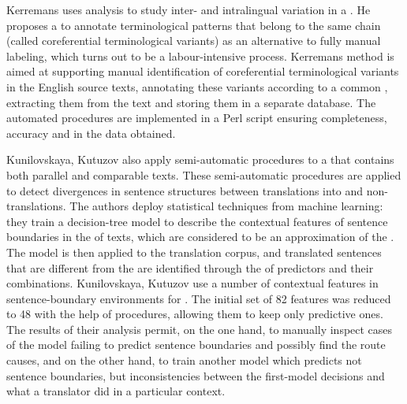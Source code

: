 \documentclass[output=paper]{langsci/langscibook.cls}
\begin{document}
	Kerremans uses  analysis to study inter- and intralingual  variation in a . He proposes a  to annotate terminological patterns that belong to the same  chain (called coreferential terminological variants) as an alternative to fully manual labeling, which turns out to be a labour-intensive process. Kerremans method is aimed at supporting manual identification of coreferential terminological variants in the English source texts, annotating these variants according to a common , extracting them from the text and storing them in a separate database. The automated procedures are implemented in a Perl script ensuring completeness, accuracy and  in the data obtained.
	
	Kunilovskaya, Kutuzov also apply semi-automatic procedures to a  that contains both parallel and comparable texts. These semi-automatic procedures are applied to detect divergences in sentence structures between translations into  and  non-translations.  
	The authors deploy statistical techniques from machine learning: they train a decision-tree model to describe the contextual features of sentence boundaries in the  of  texts, which are considered to be an approximation of the  . The model is then applied to the translation  corpus, and translated sentences that are different from the   are identified through the  of predictors and their combinations. Kunilovskaya, Kutuzov use a number of contextual features in sentence-boundary environments for . The initial set of 82 features was reduced to 48 with the help of  procedures, allowing them to keep only predictive ones. The results of their analysis permit, on the one hand, to manually inspect cases of the model failing to predict sentence boundaries and possibly find the route causes, and on the other hand, to train another model which predicts not sentence boundaries, but inconsistencies between the first-model decisions and what a translator did in a particular context.
	
\end{document}
